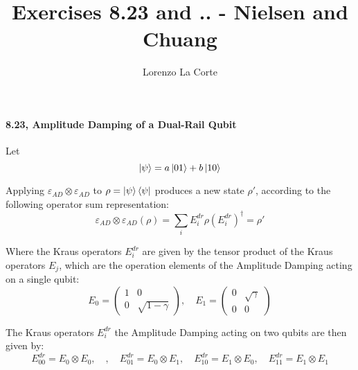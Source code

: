 \documentclass{report}
\begin{document}
\title{Exercises 8.23 and .. - Nielsen and Chuang}

\author{Lorenzo La Corte}

\maketitle

\paragraph{8.23, Amplitude Damping of a Dual-Rail Qubit}

Let
\begin{equation}
    \ket{\psi}=a\ket{01}+b\ket{10}
\end{equation}

Applying $\varepsilon_{A D} \otimes \varepsilon_{A D}$ to $\rho=\ket{\psi}\bra{\psi}$ produces a new state $\rho'$, according to the following operator sum representation:
\begin{equation}
    \varepsilon_{A D} \otimes \varepsilon_{A D}(\rho) = \sum_{i} E_{i}^{dr} \rho (E_{i}^{dr})^{\dagger} = \rho'
\end{equation}

Where the Kraus operators $E_{i}^{dr}$ are given by the tensor product of the Kraus operators $E_{j}$, which are the operation elements of the Amplitude Damping acting on a single qubit:
\begin{equation}
    E_{0} = \begin{pmatrix} 1 & 0 \\ 0 & \sqrt{1-\gamma} \end{pmatrix}, \quad E_{1} = \begin{pmatrix} 0 & \sqrt{\gamma} \\ 0 & 0 \end{pmatrix}
\end{equation}

The Kraus operators $E_{i}^{dr}$ the Amplitude Damping acting on two qubits are then given by:
\begin{equation}
    E_{00}^{dr} = E_{0} \otimes E_{0}, \quad , \quad E_{01}^{dr} = E_{0} \otimes E_{1}, \quad E_{10}^{dr} = E_{1} \otimes E_{0}, \quad E_{11}^{dr} = E_{1} \otimes E_{1}
\end{equation}
\end{document}
